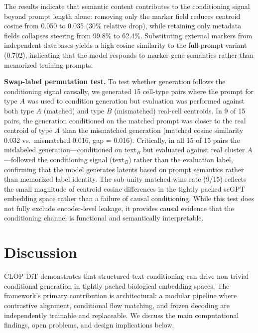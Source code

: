 The results indicate that semantic content contributes to the conditioning signal beyond prompt length alone: removing only the marker field reduces centroid cosine from 0.050 to 0.035 (30\% relative drop), while retaining only metadata fields collapses steering from 99.8\% to 62.4\%. Substituting external markers from independent databases yields a high cosine similarity to the full-prompt variant (0.702), indicating that the model responds to marker-gene semantics rather than memorized training prompts.

\textbf{Swap-label permutation test.} To test whether generation follows the conditioning signal causally, we generated 15 cell-type pairs where the prompt for type $A$ was used to condition generation but evaluation was performed against both type $A$ (matched) and type $B$ (mismatched) real-cell centroids. In 9 of 15 pairs, the generation conditioned on the matched prompt was closer to the real centroid of type $A$ than the mismatched generation (matched cosine similarity 0.032 vs.\ mismatched 0.016, gap = 0.016). Critically, in all 15 of 15 pairs the mislabeled generation---conditioned on text$_B$ but evaluated against real cluster $A$---followed the conditioning signal (text$_B$) rather than the evaluation label, confirming that the model generates latents based on prompt semantics rather than memorized label identity. The sub-unity matched-wins rate (9/15) reflects the small magnitude of centroid cosine differences in the tightly packed scGPT embedding space rather than a failure of causal conditioning. While this test does not fully exclude encoder-level leakage, it provides causal evidence that the conditioning channel is functional and semantically interpretable.

\section{Discussion}\label{sec:discussion}

CLOP-DiT demonstrates that structured-text conditioning can drive non-trivial conditional generation in tightly-packed biological embedding spaces. The framework's primary contribution is architectural: a modular pipeline where contrastive alignment, conditional flow matching, and frozen decoding are independently trainable and replaceable. We discuss the main computational findings, open problems, and design implications below.

